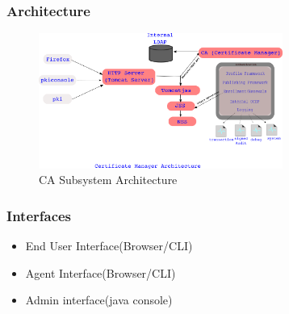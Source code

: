 \documentclass[12pt]{report}
\begin{document}
\subsubsection{Architecture}
     \begin{figure}[H]
          \centering
          \includegraphics[width=80mm]{Images/CA-subsystem-Arch3.png}
          \caption{CA Subsystem Architecture}
    \end{figure}
\subsubsection{Interfaces}
    \begin{itemize}
        \item End User Interface(Browser/CLI)
        \item Agent Interface(Browser/CLI)
        \item Admin interface(java console)
    \end{itemize}
\end{document}
